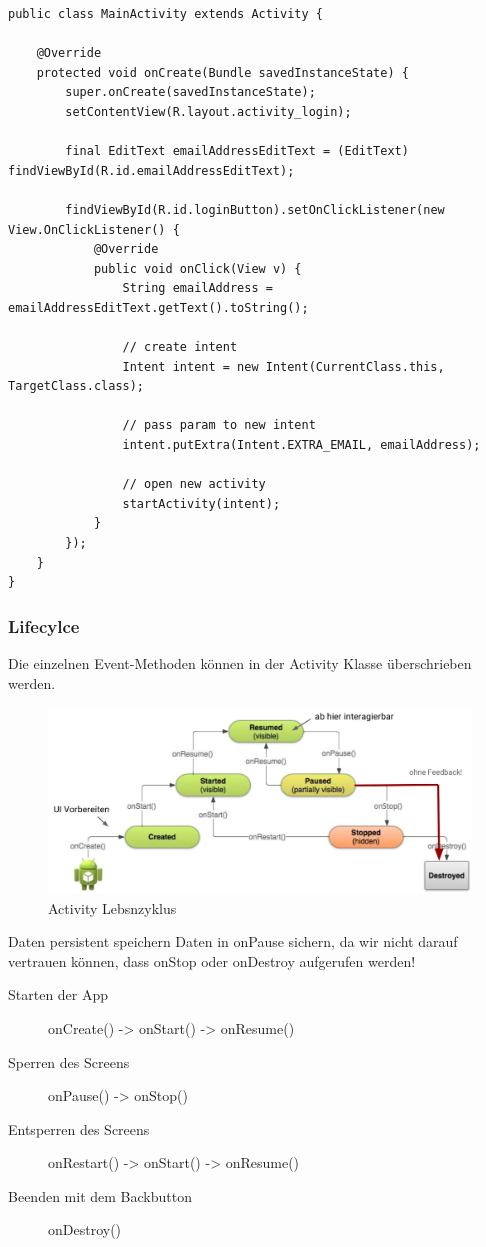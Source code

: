 \begin{lstlisting}[caption=Main Activity Grundgerüst]
public class MainActivity extends Activity {
	
	@Override
	protected void onCreate(Bundle savedInstanceState) {
		super.onCreate(savedInstanceState);
		setContentView(R.layout.activity_login);
		
		final EditText emailAddressEditText = (EditText) findViewById(R.id.emailAddressEditText);
		
		findViewById(R.id.loginButton).setOnClickListener(new View.OnClickListener() {
			@Override
			public void onClick(View v) {
				String emailAddress = emailAddressEditText.getText().toString();
				
				// create intent            
				Intent intent = new Intent(CurrentClass.this, TargetClass.class);
				
				// pass param to new intent
				intent.putExtra(Intent.EXTRA_EMAIL, emailAddress);
				
				// open new activity
				startActivity(intent);
			}
		});
	}
}
\end{lstlisting}


\subsubsection{Lifecylce}
Die einzelnen Event-Methoden können in der Activity Klasse überschrieben werden.

\begin{figure}[h]
\centering
\includegraphics[width=0.7\linewidth]{images/android_lifecycle}
\caption{Activity Lebsnzyklus}
\label{fig:androidlifecycle}
\end{figure}

\begin{remember}{Daten persistent speichern}{}
Daten in onPause sichern, da wir nicht darauf vertrauen können, dass onStop oder onDestroy aufgerufen werden!
\end{remember}

\begin{description}
	\item[Starten der App] onCreate() -> onStart() -> onResume()
	\item[Sperren des Screens] onPause() -> onStop()
	\item[Entsperren des Screens] onRestart() -> onStart() -> onResume()
	\item[Beenden mit dem Backbutton] onDestroy()
\end{description}


